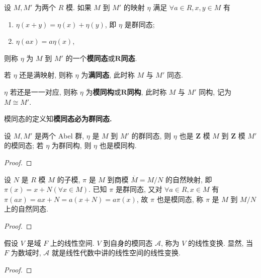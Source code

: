 \documentclass[../../main.tex]{subfiles}
\begin{document}
\begin{definition}
设 \( M, M' \) 为两个 \( R \) 模. 如果 \( M \) 到 \( M' \) 的映射 \( \eta \) 满足 \( \forall a \in R, x, y \in M \) 有
\begin{enumerate}[(1)]
\item \( \eta(x + y) = \eta(x) + \eta(y) \), 即 \( \eta \) 是群同态;
\item \( \eta(ax) = a\eta(x) \),
\end{enumerate}
则称 \( \eta \) 为 \( M \) 到 \( M' \) 的一个\textbf{模同态}或\(\boldsymbol{R}\)\textbf{同态}.

若 \( \eta \) 还是满映射, 则称 \( \eta \) 为\textbf{满同态}, 此时称 \( M \) 与 \( M' \) 同态.

\( \eta \) 若还是一一对应, 则称 \( \eta \) 为\textbf{模同构}或\(\boldsymbol{R}\)\textbf{同构}, 此时称 \( M \) 与 \( M' \) 同构, 记为 \( M \cong M' \).
\end{definition}
\begin{remark}
模同态的定义知\textbf{模同态必为群同态.}
\end{remark}

\begin{example}\label{example:抽象代数-例题1.6.10}
设 \( M, M' \) 是两个 Abel 群, \( \eta \) 是 \( M \) 到 \( M' \) 的群同态, 则 \( \eta \) 也是 \( \mathbf{Z} \) 模 \( M \) 到 \( \mathbf{Z} \) 模 \( M' \) 的模同态; 若 \( \eta \) 为群同构, 则 \( \eta \) 也是模同构.
\end{example}
\begin{proof}


\end{proof}

\begin{example}
设 \( N \) 是 \( R \) 模 \( M \) 的子模, \( \pi \) 是 \( M \) 到商模 \( \overline{M} = M/N \) 的自然映射, 即 \( \pi(x) = x + N (\forall x \in M) \). 已知 \( \pi \) 是群同态, 又对 \( \forall a \in R, x \in M \) 有 \( \pi(ax) = ax + N = a(x + N) = a\pi(x) \), 故 \( \pi \) 也是模同态, 称 \( \pi \) 是 \( M \) 到 \( M/N \) 上的自然同态.
\end{example}
\begin{proof}


\end{proof}

\begin{example}
假设 \( V \) 是域 \( F \) 上的线性空间. \( V \) 到自身的模同态 \( \mathcal{A} \), 称为 \( V \) 的线性变换. 显然, 当 \( F \) 为数域时, \( \mathcal{A} \) 就是线性代数中讲的线性空间的线性变换.
\end{example}
\begin{proof}


\end{proof}
\end{document}
